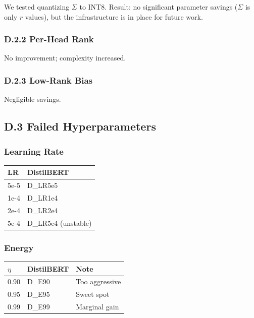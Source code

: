 We tested quantizing $\Sigma$ to INT8. Result: no significant parameter 
savings ($\Sigma$ is only $r$ values), but the infrastructure is in place for 
future work.

\subsubsection{D.2.2 Per-Head Rank}

No improvement; complexity increased.

\subsubsection{D.2.3 Low-Rank Bias}

Negligible savings.

\subsection{D.3 Failed Hyperparameters}

\subsubsection{Learning Rate}

\begin{table}[H]
\centering
\small
\begin{tabular}{ll}
\toprule
\textbf{LR} & \textbf{DistilBERT} \\
\midrule
5e-5 & {{D\_LR5e5}} \\
1e-4 & {{D\_LR1e4}} \\
2e-4 & {{D\_LR2e4}} \\
5e-4 & {{D\_LR5e4}} (unstable) \\
\bottomrule
\end{tabular}
\end{table}

\subsubsection{Energy}

\begin{table}[H]
\centering
\small
\begin{tabular}{lll}
\toprule
\textbf{$\eta$} & \textbf{DistilBERT} & \textbf{Note} \\
\midrule
0.90 & {{D\_E90}} & Too aggressive \\
0.95 & {{D\_E95}} & Sweet spot \\
0.99 & {{D\_E99}} & Marginal gain \\
\bottomrule
\end{tabular}
\end{table}

